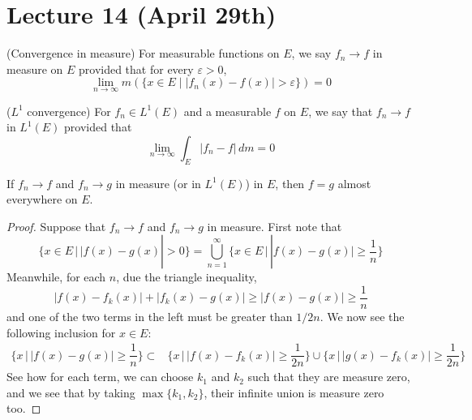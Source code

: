 \section{Lecture 14 (April 29th)}
\begin{defi}
(Convergence in measure) For measurable functions on $E$, we say $f_{n}\rightarrow f$ in measure on $E$ provided that for every $\varepsilon >0$, 
\[\lim _{n\rightarrow \infty }m(\{x\in E\;|\;|f_{n}(x)-f(x)|>\varepsilon \})=0\]
\end{defi}
\vspace{2ex}
\begin{defi}
($L^{1}$ convergence) For $f_{n}\in L^{1}(E)$ and a measurable $f$ on $E$, we say that $f_{n}\rightarrow f$ in $L^{1}(E)$ provided that 
\[\lim _{n\rightarrow \infty }\int _{E}|f_{n}-f|\,dm=0\]
\end{defi}
\vspace{2ex}
\begin{thm}
If $f_{n}\rightarrow f$ and $f_{n}\rightarrow g$ in measure (or in $L^{1}(E)$) in $E$, then $f=g$ almost everywhere on $E$. 
\end{thm}
\vspace{2ex}
\begin{proof}
Suppose that $f_{n}\rightarrow f$ and $f_{n}\rightarrow g$ in measure. First note that 
\[\{x\in E \,|\, |f(x)-g(x)|>0\}=\bigcup ^{\infty }_{n=1}\Big\{x\in E \,\Big|\, |f(x)-g(x)|\geq \dfrac{1}{n}\Big\}\]
Meanwhile, for each $n$, due the triangle inequality, 
\[|f(x)-f_{k}(x)|+|f_{k}(x)-g(x)|\geq |f(x)-g(x)|\geq  \dfrac{1}{n}\]
and one of the two terms in the left must be greater than $1/2n$. We now see the following inclusion for $x\in E$:
\begin{align*}
\Big\{x \,\Big|\,|f(x)-g(x)|\geq \dfrac{1}{n}\Big\}\subset &\Big\{x\,\Big|\, |f(x)-f_{k}(x)|\geq \dfrac{1}{2n}\Big\}\cup \{x\,\Big|\,|g(x)-f_k(x)|\geq \dfrac{1}{2n} \Big\}
\end{align*}
See how for each term, we can choose $k_1$ and $k_2$ such that they are measure zero, and we see that by taking $\max\{k_1,k_2\}$, their infinite union is measure zero too.
\end{proof}
\vspace{2ex}
